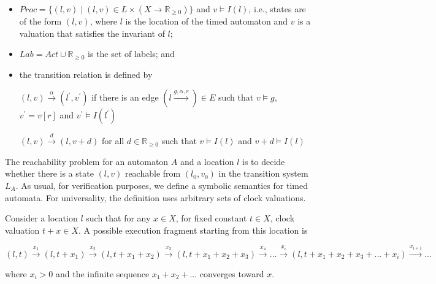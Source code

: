 \begin{itemize}
\item 
$Proc = \lbrace(l,v) \mid (l,v) \in L \times (X \rightarrow \mathbb{R}_{\geqslant{0}})\rbrace$ and $v \models I(l)$, i.e., states are of the form $(l,v)$, where $l$ is the location of the timed automaton and $v$ is a valuation that satisfies the invariant of $l$;
\item
$Lab = Act \cup \mathbb{R}_{\geqslant{0}}$ is the set of labels; and 
\item
the transition relation is defined by 

$(l,v) \xrightarrow{\alpha} (l^{\prime},v^{\prime})$ if there is an edge $(l \xrightarrow{g,\alpha,r}) \in E$ such that $v \models g$, $v^{\prime} = v[r]$ and $v^{\prime} \models I(l^{\prime})$

$(l,v) \xrightarrow{d} (l,v+d)$ for all $d \in  \mathbb{R}_{\geqslant{0}}$ such that $v \models I(l)$ and $v + d \models I(l)$
\end{itemize}
The reachability problem for an automaton $A$ and a location $l$ is to decide whether there is a state $(l,v)$ reachable from $(l_{0},v_{0})$ in the transition system $L_{A}$. As usual, for verification purposes, we define a symbolic semantics for timed automata. For universality, the definition uses arbitrary sets of clock valuations.

Consider a location $l$ such that for any $x \in X$, for fixed constant $t \in X$, clock valuation $t + x \in X$. A possible execution fragment starting from this location is

$(l,t) \xrightarrow{x_{1}} (l,t+x_{1}) \xrightarrow{x_{2}} (l,t+x_{1}+x_{2}) \xrightarrow{x_{3}} (l,t+x_{1}+x_{2}+x_{3}) \xrightarrow{x_{4}}...\xrightarrow{x_{i}}(l,t+x_{1}+x_{2}+x_{3}+...+x_{i}) \xrightarrow{x_{i+1}}...$

where $x_{i} > 0$ and the infinite sequence $x_{1} + x_{2} + . . .$ converges toward $x$. 





